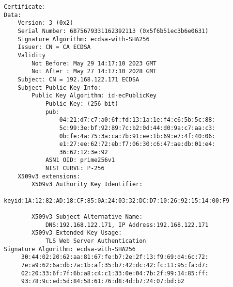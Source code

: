 \documentclass[
10pt, %
a4paper, %
oneside, %
headinclude,footinclude, %
BCOR5mm, %
]{scrartcl}
\begin{document}
\begin{lstlisting}
Certificate:
Data:
    Version: 3 (0x2)
    Serial Number: 6875679331162392113 (0x5f6b51ec3b6e0631)
    Signature Algorithm: ecdsa-with-SHA256
    Issuer: CN = CA ECDSA
    Validity
        Not Before: May 29 14:17:10 2023 GMT
        Not After : May 27 14:17:10 2028 GMT
    Subject: CN = 192.168.122.171 ECDSA
    Subject Public Key Info:
        Public Key Algorithm: id-ecPublicKey
            Public-Key: (256 bit)
            pub:
                04:21:d7:c7:a0:6f:fd:13:1a:1e:f4:c6:5b:5c:88:
                5c:99:3e:bf:92:89:7c:b2:0d:44:d0:9a:c7:aa:c3:
                0b:fe:4a:75:3a:ca:7b:91:ee:1b:69:e7:4f:40:06:
                e1:27:ee:62:72:eb:f7:06:30:c6:47:ae:db:01:e4:
                36:62:12:3e:92
            ASN1 OID: prime256v1
            NIST CURVE: P-256
    X509v3 extensions:
        X509v3 Authority Key Identifier: 
            keyid:1A:12:82:AD:18:CF:85:0A:24:03:32:DC:D7:10:26:92:15:14:00:F9

        X509v3 Subject Alternative Name: 
            DNS:192.168.122.171, IP Address:192.168.122.171
        X509v3 Extended Key Usage: 
            TLS Web Server Authentication
Signature Algorithm: ecdsa-with-SHA256
     30:44:02:20:62:aa:81:67:fe:b7:2e:2f:13:f9:69:d4:6c:72:
     7e:a9:62:6a:db:7a:1b:af:35:b7:42:dc:42:fc:11:95:fa:d7:
     02:20:33:6f:7f:6b:a8:c4:c1:33:0e:04:7b:2f:99:14:85:ff:
     93:78:9c:ed:5d:84:58:61:76:d8:4d:b7:24:07:bd:b2

\end{lstlisting}





\newpage
\renewcommand{\refname}{\spacedlowsmallcaps{References}} %



\end{document}
